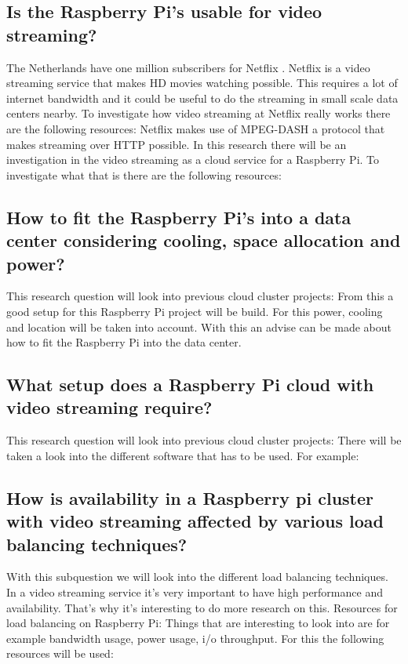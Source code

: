 \documentclass{sig-alternate-br}
\begin{document}
\subsection{Is the Raspberry Pi’s usable for video streaming?}
 The Netherlands have one million subscribers for Netflix \cite{volkskrant}. Netflix is a video streaming service that makes HD movies watching possible. This requires a lot of internet bandwidth and it could be useful to do the streaming in small scale data centers nearby. To investigate how video streaming at Netflix really works there are the following resources:
\cite{volkskrant, Adhikari:2012} \newline
Netflix makes use of MPEG-DASH a protocol that makes streaming over HTTP possible. In this research there will be an investigation in the video streaming as a cloud service for a Raspberry Pi. To investigate what that is there are the following resources:
\cite{raspberry-video,video-1080p, plissonneau:2012, computer-networking}

\subsection{How to fit the Raspberry Pi's into a data center considering cooling, space allocation and power?}
This research question will look into previous cloud cluster projects: 
\cite{abrahamsson:2013,southampton, tso:2013, beloglazov:2010,cox:2014} \newline
From this a good setup for this Raspberry Pi project will be build. For this power, cooling and location will be taken into account. With this an advise can be made about how to fit the Raspberry Pi into the data center.
\subsection{What setup does a Raspberry Pi cloud with video streaming require?}
This research question will look into previous cloud cluster projects: 
\cite{abrahamsson:2013,southampton, tso:2013, beloglazov:2010,cox:2014} \newline
 There will be taken a look into the different software that has to be used. For example: 
\cite{raspberry-video,video-1080p, permission, nmon,bandwidth,ab, mosberger1998httperf, httperf-2, raspbian} 

\subsection{How is availability in a Raspberry pi cluster with video streaming affected by various load balancing techniques?}
With this subquestion we will look into the different load balancing techniques. In a video streaming service it's very important to have high performance and availability. That's why it's interesting to do more research on this. Resources for load balancing on Raspberry Pi:
\cite{nginx-load-balancing,nginx-load-balancing-2, nginx-load-balancing-3, Raspberry-media-server, dropbox-clone} \newline
Things that are interesting to look into are for example bandwidth usage, power usage, i/o throughput. For this the following resources will be used: 
\cite{nmon,bandwidth,ab}
\end{document}
